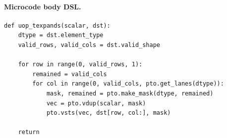 \paragraph{Microcode body DSL.}
\begin{lstlisting}[style=ptocode]
def uop_texpands(scalar, dst):
    dtype = dst.element_type
    valid_rows, valid_cols = dst.valid_shape

    for row in range(0, valid_rows, 1):
        remained = valid_cols
        for col in range(0, valid_cols, pto.get_lanes(dtype)):
            mask, remained = pto.make_mask(dtype, remained)
            vec = pto.vdup(scalar, mask)
            pto.vsts(vec, dst[row, col:], mask)

    return
\end{lstlisting}
\Needspace{0.34\textheight}
